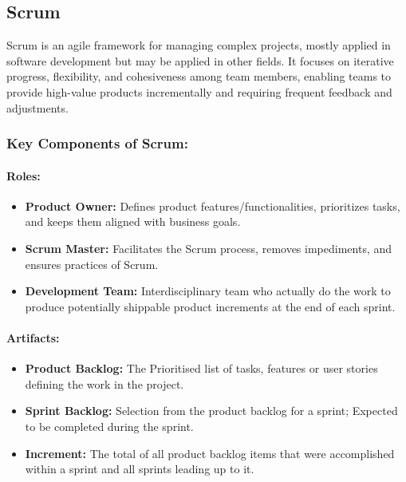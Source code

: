 \documentclass[11pt]{report}
\begin{document}
\subsection{Scrum}

Scrum is an agile framework for managing complex projects, mostly applied in software development but may be applied in other fields. It focuses on iterative progress, flexibility, and cohesiveness among team members, enabling teams to provide high-value products incrementally and requiring frequent feedback and adjustments.

\subsubsection*{Key Components of Scrum:}

\paragraph{Roles:}
\begin{itemize}
    \item \textbf{Product Owner:} Defines product features/functionalities, prioritizes tasks, and keeps them aligned with business goals.
    \item \textbf{Scrum Master:} Facilitates the Scrum process, removes impediments, and ensures practices of Scrum.
    \item \textbf{Development Team:} Interdisciplinary team who actually do the work to produce potentially shippable product increments at the end of each sprint.
\end{itemize}

\paragraph{Artifacts:}
\begin{itemize}
    \item \textbf{Product Backlog:} The Prioritised list of tasks, features or user stories defining the work in the project.
    \item \textbf{Sprint Backlog:} Selection from the product backlog for a sprint; Expected to be completed during the sprint.
    \item \textbf{Increment:} The total of all product backlog items that were accomplished within a sprint and all sprints leading up to it.
\end{itemize}
\end{document}
